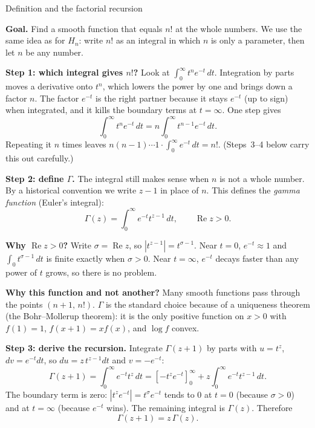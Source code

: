 \documentclass[11pt]{beamer}
\begin{document}
\begin{frame}[allowframebreaks=1.00]{Definition and the factorial recursion}
\footnotesize

\textbf{Goal.} Find a smooth function that equals \(n!\) at the whole numbers. We use the same
idea as for \(H_n\): write \(n!\) as an integral in which \(n\) is only a parameter, then let
\(n\) be any number.

\textbf{Step 1: which integral gives \(n!\)?} Look at \(\int_0^\infty t^ne^{-t}\,dt\).
Integration by parts moves a derivative onto \(t^n\), which lowers the power by one and brings
down a factor \(n\). The factor \(e^{-t}\) is the right partner because it stays \(e^{-t}\) (up to
sign) when integrated, and it kills the boundary terms at \(t=\infty\). One step gives
\[
 \int_0^\infty t^ne^{-t}\,dt=n\int_0^\infty t^{n-1}e^{-t}\,dt .
\]
Repeating it \(n\) times leaves \(n(n-1)\cdots1\cdot\int_0^\infty e^{-t}\,dt=n!\). (Steps~3--4 below
carry this out carefully.)

\textbf{Step 2: define \(\Gamma\).} The integral still makes sense when \(n\) is not a whole number.
By a historical convention we write \(z-1\) in place of \(n\). This defines the \emph{gamma
function} (Euler's integral):
\begin{equation}
  \Gamma(z)=\int_0^\infty e^{-t}t^{z-1}\,dt,
  \qquad \operatorname{Re}z>0.
  \label{eq:gamma-def}
\end{equation}


\textbf{Why \(\operatorname{Re}z>0\)?} Write \(\sigma=\operatorname{Re}z\), so \(|t^{z-1}|=t^{\sigma-1}\). Near \(t=0\), \(e^{-t}\approx1\)
and \(\int_0 t^{\sigma-1}\,dt\) is finite exactly when \(\sigma>0\). Near \(t=\infty\), \(e^{-t}\) decays faster than any
power of \(t\) grows, so there is no problem.

\textbf{Why this function and not another?} Many smooth functions pass through the points
\((n+1,\,n!)\). \(\Gamma\) is the standard choice because of a uniqueness theorem (the Bohr--Mollerup
theorem): it is the only positive function on \(x>0\) with \(f(1)=1\), \(f(x+1)=xf(x)\), and
\(\log f\) convex.



\textbf{Step 3: derive the recursion.}  Integrate \(\Gamma(z+1)\) by parts with \(u=t^z\),
\(dv=e^{-t}dt\), so \(du=z\,t^{z-1}dt\) and \(v=-e^{-t}\):
\[
  \Gamma(z+1)
   =\int_0^\infty e^{-t}t^z\,dt
   =\left[-t^ze^{-t}\right]_{0}^{\infty}
     +z\int_0^\infty e^{-t}t^{z-1}\,dt.
\]
The boundary term is zero: \(|t^ze^{-t}|=t^\sigma e^{-t}\) tends to \(0\) at \(t=0\) (because
\(\sigma>0\)) and at \(t=\infty\) (because \(e^{-t}\) wins). The remaining integral is \(\Gamma(z)\).
Therefore
\begin{equation}
  \Gamma(z+1)=z\,\Gamma(z).
  \label{eq:gamma-rec}
\end{equation}


\end{frame}
\end{document}
